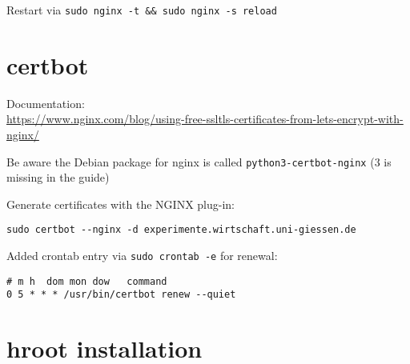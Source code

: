 \documentclass{article}
\begin{document}
Restart via \verb|sudo nginx -t && sudo nginx -s reload|

\section{certbot}
Documentation: \\
\url{https://www.nginx.com/blog/using-free-ssltls-certificates-from-lets-encrypt-with-nginx/} 

Be aware the Debian package for nginx is called \verb|python3-certbot-nginx| (3 is missing in the guide)

Generate certificates with the NGINX plug-in:
\begin{verbatim}
sudo certbot --nginx -d experimente.wirtschaft.uni-giessen.de
\end{verbatim}

Added crontab entry via \verb|sudo crontab -e| for renewal:
\begin{lstlisting}
# m h  dom mon dow   command
0 5 * * * /usr/bin/certbot renew --quiet
\end{lstlisting}

\section{hroot installation}
\end{document}
